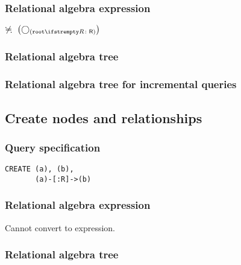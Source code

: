 \subsubsection*{Relational algebra expression}

$\alldifferent{} \left(\getvertices{root}{R}\right)$

\subsubsection*{Relational algebra tree}


\subsubsection*{Relational algebra tree for incremental queries}


\subsection{Create nodes and relationships}

\subsubsection*{Query specification}

\begin{lstlisting}
CREATE (a), (b),
       (a)-[:R]->(b)
\end{lstlisting}

\subsubsection*{Relational algebra expression}

Cannot convert to expression.

\subsubsection*{Relational algebra tree}

